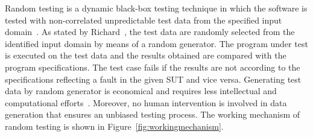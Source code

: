 Random testing is a dynamic black-box testing technique in which the software is tested with non-correlated unpredictable test data from the specified input domain~\cite{chan2003normalized}. As stated by Richard~\cite{hamlet1994random}, the test data are randomly selected from the identified input domain by means of a random generator. The program under test is executed on the test data and the results obtained are compared with the program specifications. The test case fails if the results are not according to the specifications reflecting a fault in the given SUT and vice versa. Generating test data by random generator is economical and requires less intellectual and computational efforts~\cite{ciupa2008artoo}. Moreover, no human intervention is involved in data generation that ensures an unbiased testing process. The working mechanism of random testing is shown in Figure~\ref{fig:workingmechanism}.


